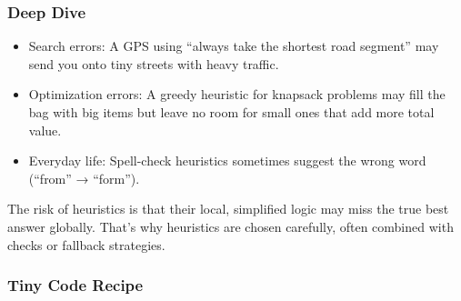 \documentclass[
  letterpaper,
  DIV=11,
  numbers=noendperiod]{scrreprt}
\providecommand{\tightlist}{%
  \setlength{\itemsep}{0pt}\setlength{\parskip}{0pt}}
\begin{document}
\subsubsection{Deep Dive}\label{deep-dive-54}

\begin{itemize}
\tightlist
\item
  Search errors: A GPS using ``always take the shortest road segment''
  may send you onto tiny streets with heavy traffic.
\item
  Optimization errors: A greedy heuristic for knapsack problems may fill
  the bag with big items but leave no room for small ones that add more
  total value.
\item
  Everyday life: Spell-check heuristics sometimes suggest the wrong word
  (``from'' → ``form'').
\end{itemize}

The risk of heuristics is that their local, simplified logic may miss
the true best answer globally. That's why heuristics are chosen
carefully, often combined with checks or fallback strategies.

\subsubsection{Tiny Code Recipe}\label{tiny-code-recipe-82}
\end{document}
